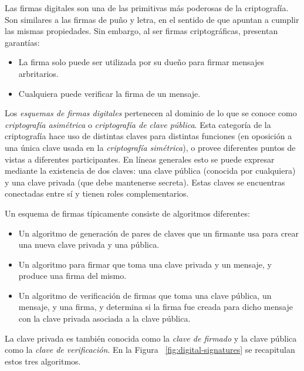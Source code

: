 %
Las firmas digitales son una de las primitivas más poderosas de la criptografía.
Son similares a las firmas de puño y letra, en el sentido de que apuntan a cumplir las mismas propiedades.
Sin embargo, al ser firmas criptográficas, presentan garantías:
\begin{itemize}
  \item La firma solo puede ser utilizada por su dueño para firmar mensajes arbritarios.
  \item Cualquiera puede verificar la firma de un mensaje.
\end{itemize}
 
Los \textit{esquemas de firmas digitales} pertenecen al dominio de lo que se conoce como \textit{criptografía asimétrica}
o \textit{criptografía de clave pública}.
%
Esta categoría de la criptografía hace uso de distintas claves para distintas funciones (en oposición a una única
clave usada en la \textit{criptografía simétrica}), o provee diferentes puntos de vistas a diferentes participantes.
%
En líneas generales esto se puede expresar mediante la existencia de dos claves: una clave pública (conocida por cualquiera)
y una clave privada (que debe mantenerse secreta). Estas claves se encuentras conectadas entre sí y tienen roles complementarios.


Un esquema de firmas típicamente consiste de algoritmos diferentes:
\begin{itemize}
  \item Un algoritmo de generación de pares de claves que un firmante usa para crear una nueva clave privada y una pública.
  \item Un algoritmo para firmar que toma una clave privada y un mensaje, y produce una firma del mismo.
  \item Un algoritmo de verificación de firmas que toma una clave pública, un mensaje, y una firma, y determina si la firma
  fue creada para dicho mensaje con la clave privada asociada a la clave pública. 
\end{itemize}

La clave privada es también conocida como la \textit{clave de firmado} y la clave pública como la \textit{clave de verificación}.
En la Figura ~\ref{fig:digital-signatures} se recapitulan estos tres algoritmos.

